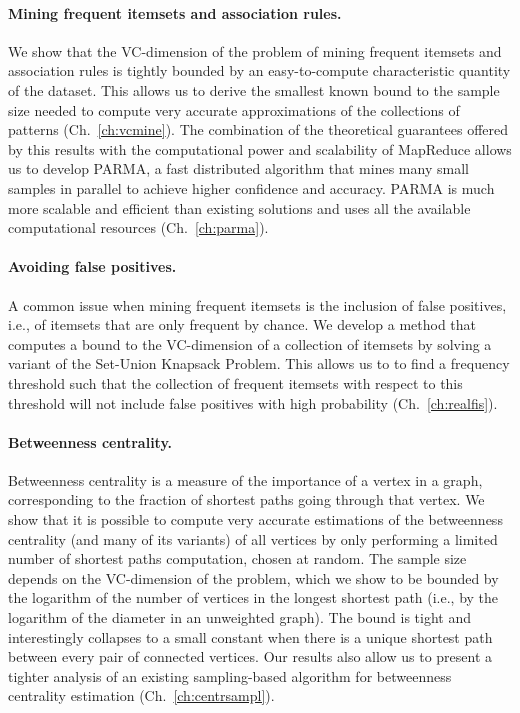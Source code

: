 \paragraph*{Mining frequent itemsets and association rules.} We show that the
VC-dimension of the problem of mining frequent itemsets and association rules is
tightly bounded by an easy-to-compute characteristic quantity of the dataset.
This allows us to derive the smallest known bound to the sample size needed to
compute very accurate approximations of the collections of patterns
(Ch.~\ref{ch:vcmine}). The combination of the theoretical guarantees offered by
this results with the computational power and scalability of MapReduce allows us
to develop PARMA, a fast distributed algorithm that mines many small samples in
parallel to achieve higher confidence and accuracy. PARMA
is much more scalable and efficient than existing solutions and uses all the
available computational resources (Ch.~\ref{ch:parma}). 

\paragraph*{Avoiding false positives.} A common issue when mining frequent
itemsets is the inclusion of false positives, i.e., of itemsets that are only
frequent by chance. We develop a method that computes a bound to the VC-dimension
of a collection of itemsets by solving a variant of the Set-Union Knapsack
Problem. This allows us to to find a frequency threshold such that the
collection of frequent itemsets with respect to this threshold will not include
false positives with high probability (Ch.~\ref{ch:realfis}).

\paragraph*{Betweenness centrality.} Betweenness centrality is a measure of the
importance of a vertex in a graph, corresponding to the fraction of shortest
paths going through that vertex. We show that it is possible to compute very
accurate estimations of the betweenness centrality (and many of its variants) of
all vertices by only performing a limited number of shortest paths computation,
chosen at random. The sample size depends on the VC-dimension of the problem,
which we show to be bounded by the logarithm of the number of vertices in the
longest shortest path (i.e., by the logarithm of the diameter in an unweighted
graph). The bound is tight and interestingly collapses to a small constant when
there is a unique shortest path between every pair of connected vertices. Our
results also allow us to present a tighter analysis of an existing
sampling-based algorithm for betweenness centrality estimation
(Ch.~\ref{ch:centrsampl}).

